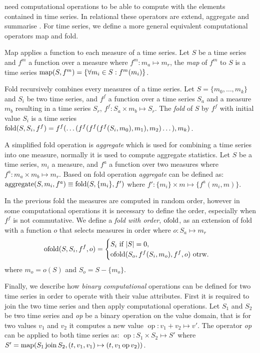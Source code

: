  need computational operations to be able to compute with
the elements contained in time series. In relational  these
operators are extend, aggregate and summarise
\cite{date:introduction}. For time series, we define a more general
equivalent computational operators map and fold.


Map applies a function to each measure of a time series.  Let $S$ be a
time series and $f^m$ a function over a measure where $f^m:m_a\mapsto
m_r$, the \emph{map} of $f^m$ to $S$ is a time series $\operatorname*{map}(S,f^m) =
\{\forall m_i\in S : f^m(m_i) \}$.

Fold recursively combines every measures of a time series.  Let
$S=\{m_0, \dotsc, m_k\}$ and $S_i$ be two time series, and $f^f$ a
function over a time series $S_a$ and a measure $m_b$ resulting in a
time series $S_r$, $f^f: S_a \times m_b \mapsto S_r$. The \emph{fold}
of $S$ by $f^f$ with initial value $S_i$ is a time series
$\operatorname*{fold}(S,S_i,f^f) = f^f(\dots( f^f(f^f(f^f(S_i,m_0),\allowbreak
m_1),\allowbreak m_2 )\dots),\allowbreak m_k)$.


A simplified fold operation is \emph{aggregate} which is used for
combining a time series into one measure, normally it is used to
compute aggregate statistics.  Let $S$ be a time series, $m_i$ a
measure, and $f^a$ a function over two measures where $f^a: m_a \times
m_b \mapsto m_r$.  Based on fold operation \emph{aggregate} can be
defined as: $\operatorname*{aggregate}(S,m_i,f^a) \equiv \operatorname*{fold}(S,\{m_i\},f')$ where $f':
\{m_i\} \times m \mapsto \{f^a(m_i,m)\}$.

In the previous fold the measures are computed in random order,
however in some computational operations it is necessary to define the
order, especially when $f^f$ is not commutative. We define a
\emph{fold with order}, $\operatorname*{ofold}$, as an extension of fold with a
function $o$ that selects measures in order where $o: S_a \mapsto m_r$
\[
 \operatorname*{ofold}(S,S_i,f^f,o) =
  \begin{cases}
    S_i  \text{ if } |S|=0, \\
    \operatorname*{ofold}(S_o,f^f(S_i,m_o),f^f,o)  \text{ otrw.}
  \end{cases}
\]
where $m_o = o(S)$ and $S_o = S - \{m_o\}$.


Finally, we describe how \emph{binary computational} operations can be
defined for two time series in order to operate with their value
attributes.  First it is required to join the two time series and then
apply computational operations. Let $S_1$ and $S_2$ be two time series
and \emph{op} be a binary operation on the value domain, that is for
two values $v_1$ and $v_2$ it computes a new value $\operatorname{op}:
v_1 + v_2 \mapsto v'$. The operator \emph{op} can be applied to both
time series as: $\operatorname{op}: S_1 \times S_2 \mapsto S'$ where
$S' = \operatorname*{map}(S_1 \operatorname*{join} S_2, (t,v_1,v_1)\mapsto(t,v_1 \operatorname{op}
v_2))$.

